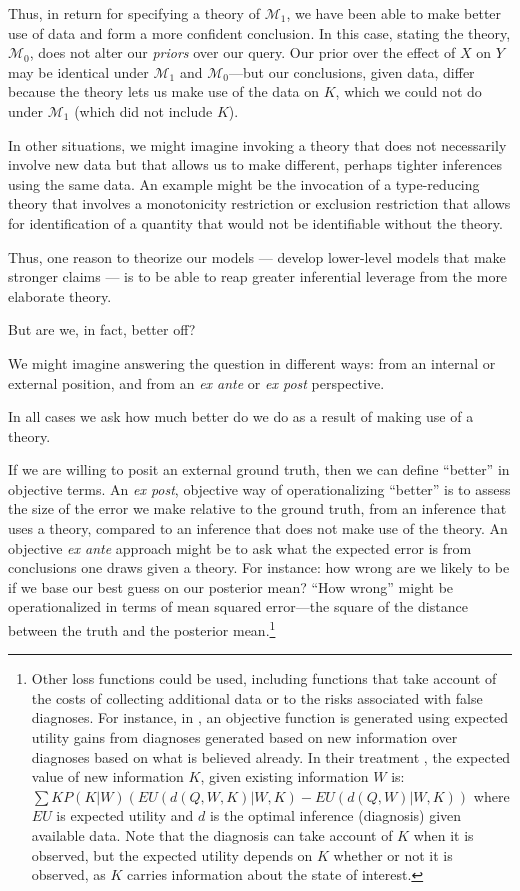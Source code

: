 \documentclass[
  12pt,
]{book}
\begin{document}
Thus, in return for specifying a theory of \(\mathcal M_1\), we have been able to make better use of data and form a more confident conclusion. In this case, stating the theory, \(\mathcal M_0\), does not alter our \emph{priors} over our query. Our prior over the effect of \(X\) on \(Y\) may be identical under \(\mathcal M_1\) and \(\mathcal M_0\)---but our conclusions, given data, differ because the theory lets us make use of the data on \(K\), which we could not do under \(\mathcal M_1\) (which did not include \(K\)).

In other situations, we might imagine invoking a theory that does not necessarily involve new data but that allows us to make different, perhaps tighter inferences using the same data. An example might be the invocation of a type-reducing theory that involves a monotonicity restriction or exclusion restriction that allows for identification of a quantity that would not be identifiable without the theory.

Thus, one reason to theorize our models --- develop lower-level models that make stronger claims --- is to be able to reap greater inferential leverage from the more elaborate theory.

But are we, in fact, better off?

We might imagine answering the question in different ways: from an internal or external position, and from an \emph{ex ante} or \emph{ex post} perspective.

In all cases we ask how much better do we do as a result of making use of a theory.

If we are willing to posit an external ground truth, then we can define ``better'' in objective terms. An \emph{ex post}, objective way of operationalizing ``better'' is to assess the size of the error we make relative to the ground truth, from an inference that uses a theory, compared to an inference that does not make use of the theory. An objective \emph{ex ante} approach might be to ask what the expected error is from conclusions one draws given a theory. For instance: how wrong are we likely to be if we base our best guess on our posterior mean? ``How wrong'' might be operationalized in terms of mean squared error---the square of the distance between the truth and the posterior mean.\footnote{Other loss functions could be used, including functions that take account of the costs of collecting additional data or to the risks associated with false diagnoses. For instance, in \citet{heckerman1991toward}, an objective function is generated using expected utility gains from diagnoses generated based on new information over diagnoses based on what is believed already. In their treatment \citep[Equation 6]{heckerman1991toward}, the expected value of new information \(K\), given existing information \(W\) is: \(\sum{K}P(K|W)( EU(d(Q,W,K)|W, K) - EU(d(Q, W)|W, K))\) where \(EU\) is expected utility and \(d\) is the optimal inference (diagnosis) given available data. Note that the diagnosis can take account of \(K\) when it is observed, but the expected utility depends on \(K\) whether or not it is observed, as \(K\) carries information about the state of interest.}
\end{document}
